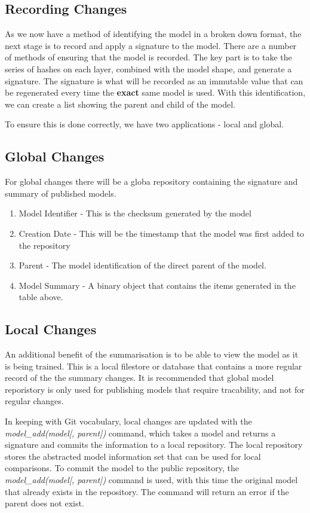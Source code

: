 \subsection{Recording Changes}
As we now have a method of identifying the model in a broken down format, the next stage is to record and apply a signature to the model. There are a number of methods of ensuring that the model is recorded. The key part is to take the series of hashes on each layer, combined with the model shape, and generate a signature. The signature is what will be recorded as an immutable value that can be regenerated every time the \textbf{exact} same model is used. With this identification, we can create a list showing the parent and child of the model.

To ensure this is done correctly, we have two applications - local and global.
\subsection{Global Changes}
For global changes there will be a globa repository containing the signature and summary of published models. 

\begin{enumerate}
    \item Model Identifier - This is the checksum generated by the model
    \item Creation Date - This will be the timestamp that the model was first added to the repository
    \item Parent - The model identification of the direct parent of the model.
    \item Model Summary - A binary object that contains the items generated in the table above.
    \end{enumerate}
\subsection{Local Changes}

An additional benefit of the summarisation is to be able to view the model as it is being trained. This is a local filestore or database that contains a more regular record of the the summary changes. It is recommended that global model reporistory is only used for publishing models that require tracability, and not for regular changes.

In keeping with Git vocabulary, local changes are updated with the \textit{model_add(model[, parent])} command, which takes a model and returns a signature and commits the information to a local repository. The local repository stores the abstracted model information set that can be used for local comparisons. To commit the model to the public repository, the \textit{model_add(model[, parent])} command is used, with this time the original model that already exists in the repository. The command will return an error if the parent does not exist.

